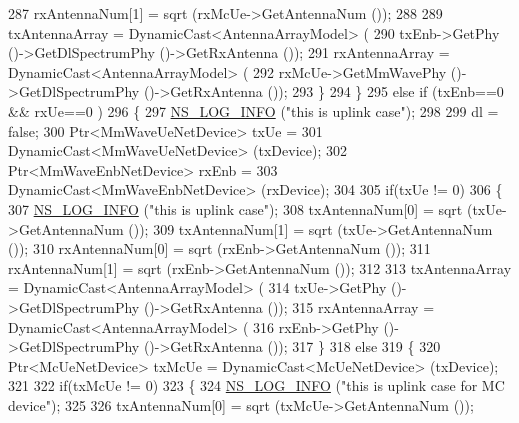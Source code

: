 \begin{DoxyCode}
287                         rxAntennaNum[1] = sqrt (rxMcUe->GetAntennaNum ());
288 
289                         txAntennaArray = DynamicCast<AntennaArrayModel> (
290                                                 txEnb->GetPhy ()->GetDlSpectrumPhy ()->GetRxAntenna ());
291                         rxAntennaArray = DynamicCast<AntennaArrayModel> (
292                                                 rxMcUe->GetMmWavePhy ()->GetDlSpectrumPhy ()->GetRxAntenna 
      ());
293                 \}
294         \} 
295         \textcolor{keywordflow}{else} \textcolor{keywordflow}{if} (txEnb==0 && rxUe==0 )
296         \{
297                 \hyperlink{group__logging_gafbd73ee2cf9f26b319f49086d8e860fb}{NS\_LOG\_INFO} (\textcolor{stringliteral}{"this is uplink case"});
298 
299                 dl = \textcolor{keyword}{false};
300                 Ptr<MmWaveUeNetDevice> txUe =
301                                                 DynamicCast<MmWaveUeNetDevice> (txDevice);
302                 Ptr<MmWaveEnbNetDevice> rxEnb =
303                                                 DynamicCast<MmWaveEnbNetDevice> (rxDevice);
304 
305                 \textcolor{keywordflow}{if}(txUe != 0)
306                 \{
307                         \hyperlink{group__logging_gafbd73ee2cf9f26b319f49086d8e860fb}{NS\_LOG\_INFO} (\textcolor{stringliteral}{"this is uplink case"}); 
308                         txAntennaNum[0] = sqrt (txUe->GetAntennaNum ());
309                         txAntennaNum[1] = sqrt (txUe->GetAntennaNum ());
310                         rxAntennaNum[0] = sqrt (rxEnb->GetAntennaNum ());
311                         rxAntennaNum[1] = sqrt (rxEnb->GetAntennaNum ());
312 
313                         txAntennaArray = DynamicCast<AntennaArrayModel> (
314                                                 txUe->GetPhy ()->GetDlSpectrumPhy ()->GetRxAntenna ());
315                         rxAntennaArray = DynamicCast<AntennaArrayModel> (
316                                                 rxEnb->GetPhy ()->GetDlSpectrumPhy ()->GetRxAntenna ());
317                 \}
318                 \textcolor{keywordflow}{else}
319                 \{
320                         Ptr<McUeNetDevice> txMcUe = DynamicCast<McUeNetDevice> (txDevice);
321 
322                         \textcolor{keywordflow}{if}(txMcUe != 0)
323                         \{
324                                 \hyperlink{group__logging_gafbd73ee2cf9f26b319f49086d8e860fb}{NS\_LOG\_INFO} (\textcolor{stringliteral}{"this is uplink case for MC device"});   
325 
326                                 txAntennaNum[0] = sqrt (txMcUe->GetAntennaNum ());

\end{DoxyCode}
